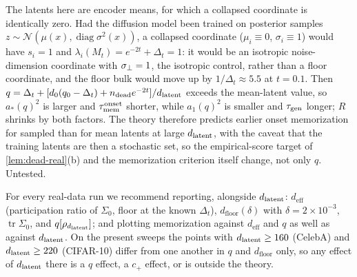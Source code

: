 \begin{remark}\label{rem:samples-real}
The latents here are encoder means, for which a collapsed coordinate is identically zero. Had the diffusion model been trained on posterior samples $z\sim\mathcal N(\mu(x),\operatorname{diag}\sigma^2(x))$, a collapsed coordinate ($\mu_i\equiv0$, $\sigma_i\equiv1$) would have $s_i=1$ and $\lambda_i(M_t)=e^{-2t}+\Delta_t=1$: it would be an isotropic noise-dimension coordinate with $\sigma_{\perp}=1$, the isotropic control, rather than a floor coordinate, and the floor bulk would move up by $1/\Delta_t\approx5.5$ at $t=0.1$. Then $q=\Delta_t+[d_0(q_0-\Delta_t)+n_{\mathrm{dead}}e^{-2t}]/d_{\mathrm{latent}}$ exceeds the mean-latent value, so $a_\ast(q)^2$ is larger and $\tau_{\mathrm{mem}}^{\mathrm{onset}}$ shorter, while $a_1(q)^2$ is smaller and $\tau_{\mathrm{gen}}$ longer; $R$ shrinks by both factors. The theory therefore predicts earlier onset memorization for sampled than for mean latents at large $d_{\mathrm{latent}}$, with the caveat that the training latents are then a stochastic set, so the empirical-score target of \cref{lem:dead-real}(b) and the memorization criterion itself change, not only $q$. Untested.
\end{remark}

\begin{remark}[Reporting]\label{rem:xaxis-real}
For every real-data run we recommend reporting, alongside $d_{\mathrm{latent}}$: $d_{\mathrm{eff}}$ (participation ratio of $\Sigma_0$, floor at the known $\Delta_t$), $d_{\mathrm{floor}}(\delta)$ with $\delta=2\times10^{-3}$, $\operatorname{tr}\Sigma_0$, and $q[\rho_{d_{\mathrm{latent}}}]$; and plotting memorization against $d_{\mathrm{eff}}$ and $q$ as well as against $d_{\mathrm{latent}}$. On the present sweeps the points with $d_{\mathrm{latent}}\ge160$ (CelebA) and $d_{\mathrm{latent}}\ge220$ (CIFAR-10) differ from one another in $q$ and $d_{\mathrm{floor}}$ only, so any effect of $d_{\mathrm{latent}}$ there is a $q$ effect, a $c_+$ effect, or is outside the theory.
\end{remark}

